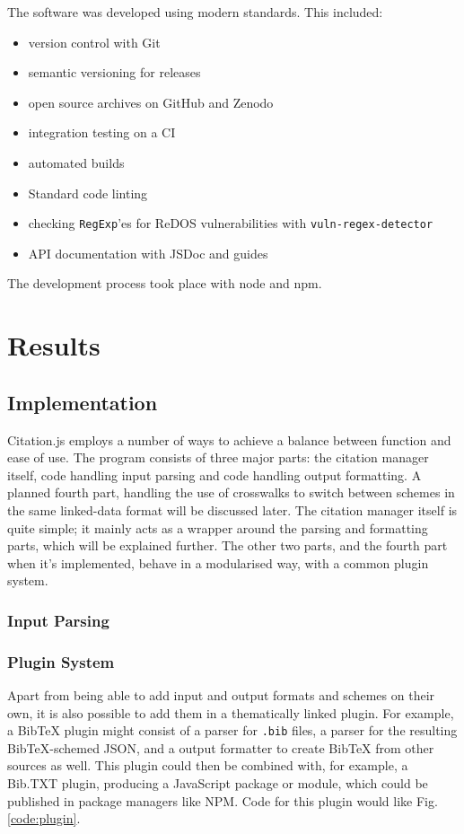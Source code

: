 \documentclass[fleqn,10pt,lineno]{wlpeerj} %
\begin{document}
The software was developed using modern standards. This included:
\begin{itemize}
\item version control with Git
\item semantic versioning for releases
\item open source archives on GitHub and Zenodo
\item integration testing on a CI
\item automated builds
\item Standard code linting
\item checking \texttt{RegExp}'es for ReDOS vulnerabilities with \texttt{vuln-regex-detector} \citep{davis_impact_nodate}
\item API documentation with JSDoc and guides
\end{itemize}
The development process took place with node and npm.

\section*{Results}

\subsection*{Implementation}

Citation.js employs a number of ways to achieve a balance between function and ease of use. The program consists of three major parts: the citation manager itself, code handling input parsing and code handling output formatting. A planned fourth part, handling the use of crosswalks to switch between schemes in the same linked-data format will be discussed later. The citation manager itself is quite simple; it mainly acts as a wrapper around the parsing and formatting parts, which will be explained further. The other two parts, and the fourth part when it's implemented, behave in a modularised way, with a common plugin system.

\subsubsection*{Input Parsing}

\subsubsection*{Plugin System}

Apart from being able to add input and output formats and schemes on their own, it is also possible to add them in a thematically linked plugin. For example, a BibTeX plugin might consist of a parser for \texttt{.bib} files, a parser for the resulting BibTeX-schemed JSON, and a output formatter to create BibTeX from other sources as well. This plugin could then be combined with, for example, a Bib.TXT plugin, producing a JavaScript package or module, which could be published in package managers like NPM. Code for this plugin would like Fig. \ref{code:plugin}.
\end{document}
